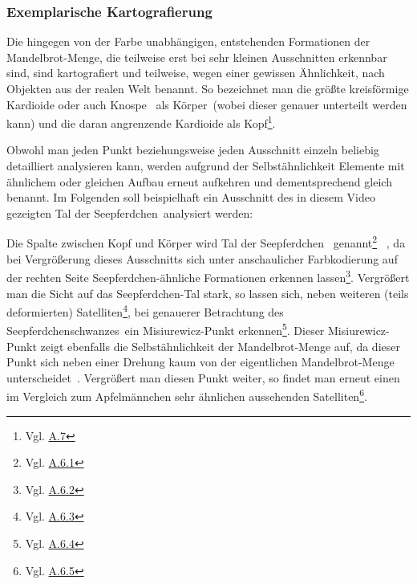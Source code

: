 \subsubsection{Exemplarische Kartografierung}

Die hingegen von der Farbe unabhängigen, entstehenden Formationen der
Mandelbrot-Menge, die teilweise erst bei sehr kleinen Ausschnitten erkennbar sind,
sind kartografiert und teilweise, wegen einer gewissen Ähnlichkeit, nach
Objekten aus der realen Welt benannt.
So bezeichnet man die größte kreisförmige Kardioide oder auch \glqq Knospe\grqq
~als \glqq K\"orper\grqq~(wobei dieser genauer unterteilt werden kann)
und die daran angrenzende Kardioide als
\glqq Kopf\grqq\footnote{Vgl. \hyperref[app:7]{A.7}}.

Obwohl man jeden Punkt beziehungsweise jeden Ausschnitt einzeln beliebig detailliert
analysieren kann, werden aufgrund der Selbstähnlichkeit Elemente mit ähnlichem
oder gleichen Aufbau erneut aufkehren und dementsprechend gleich benannt.
Im Folgenden soll beispielhaft ein Ausschnitt des in diesem
Video~\cite{beyer_zoomfahrt_2017} gezeigten
\glqq Tal der Seepferdchen\grqq~analysiert werden:

Die Spalte zwischen Kopf und K\"orper wird \glqq Tal der Seepferdchen\grqq
~genannt\footnote{Vgl. \hyperref[app:6.1]{A.6.1}}
~\cite{robert_p_seahorse_2010}, da bei Vergrößerung dieses Ausschnitts
sich unter anschaulicher Farbkodierung auf der rechten Seite
Seepferdchen-ähnliche Formationen erkennen lassen\footnote{Vgl. \hyperref[app:6.2]{A.6.2}}.
Vergrößert man die Sicht auf das Seepferdchen-Tal stark, so lassen sich,
neben weiteren (teils deformierten) Satelliten\footnote{Vgl. \hyperref[app:6.3]{A.6.3}},
bei genauerer Betrachtung des \glqq Seepferdchenschwanzes\grqq~ein
Misiurewicz-Punkt erkennen\footnote{Vgl. \hyperref[app:6.4]{A.6.4}}.
Dieser Misiurewicz-Punkt zeigt ebenfalls die Selbstähnlichkeit der Mandelbrot-Menge auf,
da dieser Punkt sich neben einer Drehung kaum von der eigentlichen
Mandelbrot-Menge unterscheidet~\cite{lei_similarity_1989}.
Vergrößert man diesen Punkt weiter, so findet man erneut einen im Vergleich
zum Apfelm\"annchen sehr ähnlichen aussehenden
Satelliten\footnote{Vgl. \hyperref[app:6.5]{A.6.5}}.